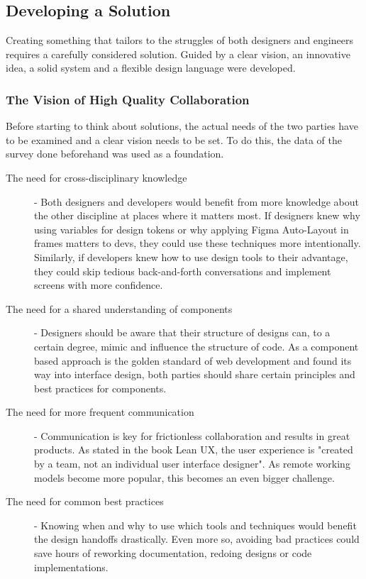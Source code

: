 \newpage
\subsection{Developing a Solution}
Creating something that tailors to the struggles of both designers and engineers requires a
carefully considered solution. Guided by a clear vision, an innovative idea, a solid system and a
flexible design language were developed.

\subsubsection{The Vision of High Quality Collaboration}
Before starting to think about solutions, the actual needs of the two parties have to be examined
and a clear vision needs to be set. To do this, the data of the survey done beforehand was used as a
foundation.

\begin{description}
      \item[The need for cross-disciplinary knowledge] - Both designers and developers would benefit
            from more knowledge about the other discipline at places where it matters most. If designers
            knew why using variables for design tokens or why applying Figma Auto-Layout in frames
            matters to devs, they could use these techniques more intentionally. Similarly, if
            developers knew how to use design tools to their advantage, they could skip tedious
            back-and-forth conversations and implement screens with more confidence.
      \item[The need for a shared understanding of components] - Designers should be aware that their
            structure of designs can, to a certain degree, mimic and influence the structure of
            code. As a component based approach is the golden standard of web development and found
            its way into interface design, both parties should share certain principles and best
            practices for components.
      \item[The need for more frequent communication] - Communication is key for frictionless
            collaboration and results in great products. As stated in the book Lean UX, the user experience
            is "created by a team, not an individual user interface designer".
             As remote working models become more
            popular, this becomes an even bigger challenge.
      \item[The need for common best practices] - Knowing when and why to use which tools and
            techniques would benefit the design handoffs drastically. Even more so, avoiding bad practices
            could save hours of reworking documentation, redoing designs or code implementations.
\end{description}

